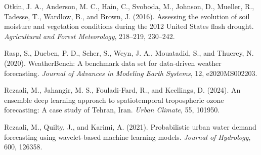 \documentclass[11pt,letterpaper]{article}
\begin{document}
\noindent Otkin, J. A., Anderson, M. C., Hain, C., Svoboda, M., Johnson, D., Mueller, R., Tadesse, T., Wardlow, B., and Brown, J. (2016). Assessing the evolution of soil moisture and vegetation conditions during the 2012 United States flash drought. \textit{Agricultural and Forest Meteorology}, 218--219, 230--242.

\noindent Rasp, S., Dueben, P. D., Scher, S., Weyn, J. A., Mouatadid, S., and Thuerey, N. (2020). WeatherBench: A benchmark data set for data-driven weather forecasting. \textit{Journal of Advances in Modeling Earth Systems}, 12, e2020MS002203.

\noindent Rezaali, M., Jahangir, M. S., Fouladi-Fard, R., and Keellings, D. (2024). An ensemble deep learning approach to spatiotemporal tropospheric ozone forecasting: A case study of Tehran, Iran. \textit{Urban Climate}, 55, 101950.

\noindent Rezaali, M., Quilty, J., and Karimi, A. (2021). Probabilistic urban water demand forecasting using wavelet-based machine learning models. \textit{Journal of Hydrology}, 600, 126358.
\end{document}
